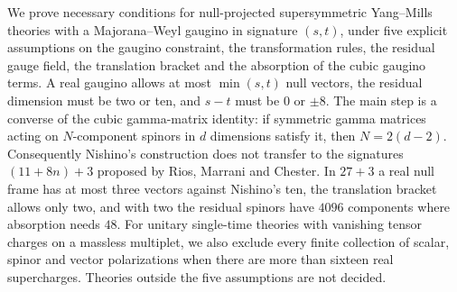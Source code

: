 We prove necessary conditions for null-projected supersymmetric Yang--Mills theories with a Majorana--Weyl gaugino in signature $(s,t)$, under five explicit assumptions on the gaugino constraint, the transformation rules, the residual gauge field, the translation bracket and the absorption of the cubic gaugino terms. A real gaugino allows at most $\min(s,t)$ null vectors, the residual dimension must be two or ten, and $s-t$ must be $0$ or $\pm8$. The main step is a converse of the cubic gamma-matrix identity: if symmetric gamma matrices acting on $N$-component spinors in $d$ dimensions satisfy it, then $N=2(d-2)$. Consequently Nishino's construction does not transfer to the signatures $(11+8n)+3$ proposed by Rios, Marrani and Chester. In $27+3$ a real null frame has at most three vectors against Nishino's ten, the translation bracket allows only two, and with two the residual spinors have $4096$ components where absorption needs $48$. For unitary single-time theories with vanishing tensor charges on a massless multiplet, we also exclude every finite collection of scalar, spinor and vector polarizations when there are more than sixteen real supercharges. Theories outside the five assumptions are not decided.
